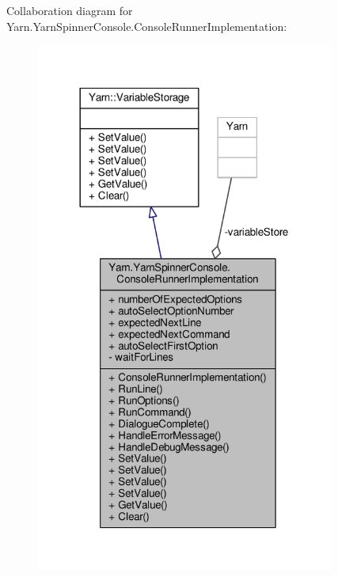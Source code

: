 Collaboration diagram for Yarn.\-Yarn\-Spinner\-Console.\-Console\-Runner\-Implementation\-:
\nopagebreak
\begin{figure}[H]
\begin{center}
\leavevmode
\includegraphics[width=278pt]{a00672}
\end{center}
\end{figure}
